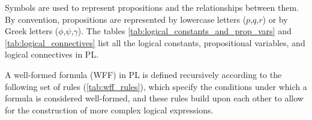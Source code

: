 Symbols are used to represent propositions and the relationships between them. By convention, propositions are represented by lowercase letters (\(p\),\(q\),\(r\)) or by Greek letters (\(\phi\),\(\psi\),\(\gamma\)). The tables \ref{tab:logical_constants_and_prop_vars} and \ref{tab:logical_connectives} list all the logical constants, propositional variables, and logical connectives in \gls{PL}. 

\begin{table}[h!]
    \centering
    \caption{Logical Constants and Propositional Variables}
    \label{tab:logical_constants_and_prop_vars}
\end{table}

\begin{table}[h!]
    \centering
    \caption{Logical Connectives}
    \label{tab:logical_connectives}
\end{table}

A well-formed formula (WFF) in \gls{PL} is defined recursively according to the following set of rules (\ref{tab:wff_rules}), which specify the conditions under which a formula is considered well-formed, and these rules build upon each other to allow for the construction of more complex logical expressions.

